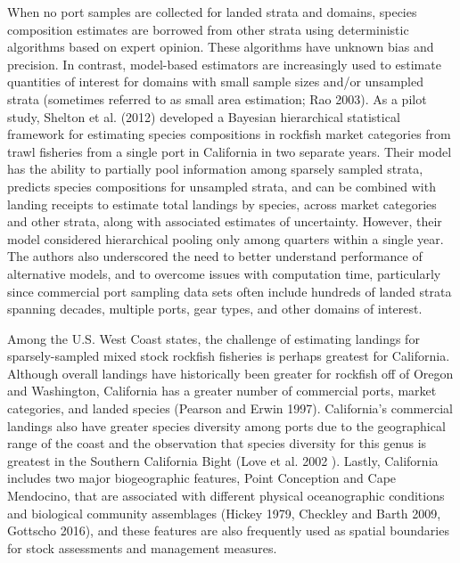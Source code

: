 \documentclass[12pt]{article}
\begin{document}
When no port samples are collected for landed strata and domains,
species composition estimates are borrowed from other strata using
deterministic algorithms based on expert opinion. These algorithms have
unknown bias and precision. In contrast, model-based estimators are
increasingly used to estimate quantities of interest for domains with
small sample sizes and/or unsampled strata (sometimes referred to as
small area estimation; Rao 2003). As a pilot study, Shelton et al.
(2012) developed a Bayesian hierarchical statistical framework for
estimating species compositions in rockfish market categories from trawl
fisheries from a single port in California in two separate years. Their
model has the ability to partially pool information among sparsely
sampled strata, predicts species compositions for unsampled strata, and
can be combined with landing receipts to estimate total landings by
species, across market categories and other strata, along with
associated estimates of uncertainty. However, their model considered
hierarchical pooling only among quarters within a single year. The
authors also underscored the need to better understand performance of
alternative models, and to overcome issues with computation time,
particularly since commercial port sampling data sets often include
hundreds of landed strata spanning decades, multiple ports, gear types,
and other domains of interest.

Among the U.S. West Coast states, the challenge of estimating landings
for sparsely-sampled mixed stock rockfish fisheries is perhaps greatest
for California. Although overall landings have historically been greater
for rockfish off of Oregon and Washington, California has a greater
number of commercial ports, market categories, and landed species
(Pearson and Erwin 1997). California's commercial landings also have greater 
species diversity among ports due to the geographical range of the coast and 
the observation that species diversity for this genus is greatest in the 
Southern California Bight (Love et al. 2002 ). Lastly, California includes two 
major biogeographic features, Point Conception and Cape Mendocino, that are 
associated with different physical oceanographic conditions and biological 
community assemblages (Hickey 1979, Checkley and Barth 2009, Gottscho 2016), 
and these features are also frequently used as spatial boundaries for 
stock assessments and management measures. 

\end{document}
